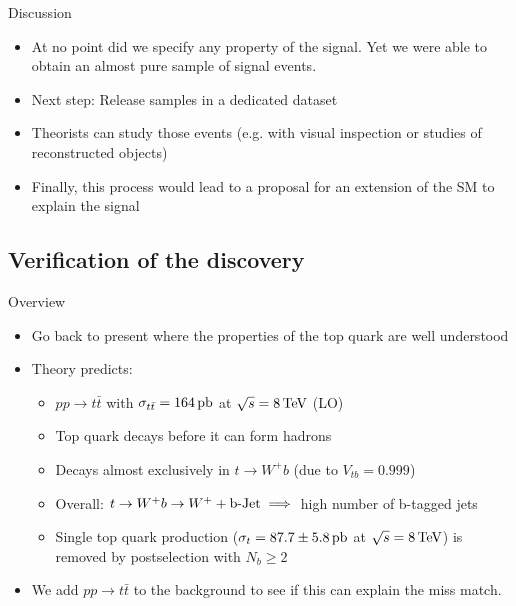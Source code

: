 \documentclass{beamer}
\begin{document}
\begin{frame}{Discussion}
\begin{itemize}
    \item<1-> At no point did we specify any property of the signal. Yet we were able to obtain an almost pure sample of signal events.
    \item<2-> Next step: Release samples in a dedicated dataset
    \item<3-> Theorists can study those events (e.g. with visual inspection or studies of reconstructed objects)
    \item<4-> Finally, this process would lead to a proposal for an extension of the SM to explain the signal
\end{itemize}
\end{frame}

\subsection{Verification of the discovery}
\begin{frame}{Overview}
\begin{itemize}
    \item<1-> Go back to present where the properties of the top quark are well understood
    \item<2-> Theory predicts:
    \begin{itemize}
        \item<3-> $pp \rightarrow t\bar{t}$ with $\sigma_{t\bar{t}}=164\,\textup{pb}$ at $\sqrt{s}=8\,\textup{TeV}$ (LO)
        \item<4-> Top quark decays before it can form hadrons
        \item<5-> Decays almost exclusively in $t \rightarrow W^+ b$ (due to $V_{tb}=0.999$)
        \item<6-> Overall: $t \rightarrow W^+ b \rightarrow W^+ + \textup{b-Jet} \implies$ high number of b-tagged jets 
        \item<7-> Single top quark production ($\sigma_{t}=87.7 \pm 5.8 \, \textup{pb}$ at $\sqrt{s}=8\,\textup{TeV}$) is removed by postselection with $N_b\geq 2$
    \end{itemize}
    
    \item<8-> We add $pp \rightarrow t\bar{t}$ to the background to see if this can explain the miss match.
\end{itemize}
\end{frame}
\end{document}
